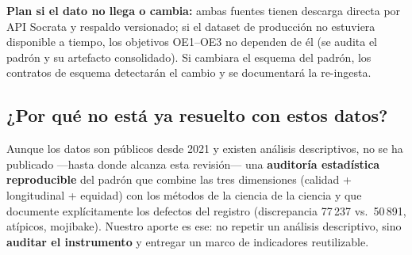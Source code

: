\textbf{Plan si el dato no llega o cambia:} ambas fuentes tienen descarga
directa por API Socrata y respaldo versionado; si el dataset de producción no
estuviera disponible a tiempo, los objetivos OE1--OE3 no dependen de él (se
audita el padrón y su artefacto consolidado). Si cambiara el esquema del
padrón, los contratos de esquema detectarán el cambio y se documentará la
re-ingesta.

\subsection{¿Por qué no está ya resuelto con estos datos?}

Aunque los datos son públicos desde 2021 y existen análisis descriptivos, no se
ha publicado —hasta donde alcanza esta revisión— una \textbf{auditoría
estadística reproducible} del padrón que combine las tres dimensiones (calidad
+ longitudinal + equidad) con los métodos de la ciencia de la ciencia y que
documente explícitamente los defectos del registro (discrepancia 77\,237 vs.\
50\,891, atípicos, mojibake). Nuestro aporte es ese: no repetir un análisis
descriptivo, sino \textbf{auditar el instrumento} y entregar un marco de
indicadores reutilizable.
